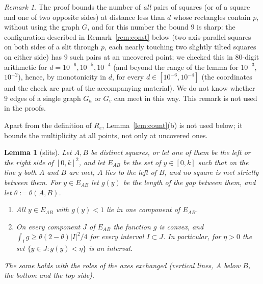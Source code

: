 \documentclass[11pt]{amsart}
\newtheorem{lemma}[theorem]{Lemma}
\theoremstyle{definition}
\theoremstyle{remark}
\newtheorem{remark}[theorem]{Remark}
\begin{document}
\begin{remark}
The proof bounds the number of \emph{all} pairs of squares (or of a square and one of two opposite sides) at distance less than $d$ whose
rectangles contain $p$, without using the graph $G$, and for this number the bound $9$ is sharp: the configuration described in
Remark~\ref{rem:const} below (two axis-parallel squares on both sides of a slit through $p$, each nearly touching two slightly
tilted squares on either side) has $9$ such pairs at an uncovered point; we checked this in $80$-digit arithmetic for
$d=10^{-6},10^{-5},10^{-4}$ (and beyond the range of the lemma for $10^{-3}$, $10^{-2}$), hence, by monotonicity in $d$,
for every $d\in[10^{-6},10^{-4}]$ (the coordinates and the check are part of the accompanying material). We do not know whether $9$ edges of a single graph $G_h$ or $G_v$ can meet in this way.
This remark is not used in the proofs.
\end{remark}

Apart from the definition of $R_e$, Lemma~\ref{lem:count}(b) is not used below; it bounds the multiplicity at all points,
not only at uncovered ones.

\begin{lemma}[slits]\label{lem:slit}
Let $A,B$ be distinct squares, or let one of them be the left or the right side of $[0,k]^2$, and let $E_{AB}$ be the set
of $y\in[0,k]$ such that on the line $y$ both $A$ and $B$ are met, $A$ lies to the left of $B$, and no square is met
strictly between them. For $y\in E_{AB}$ let $g(y)$ be the length of the gap between them, and let $\theta:=\theta(A,B)$.
\begin{enumerate}[label=(\alph*)]
\item All $y\in E_{AB}$ with $g(y)<1$ lie in one component of $E_{AB}$.
\item On every component $J$ of $E_{AB}$ the function $g$ is convex, and $\int_Ig\ge\theta(2-\theta)|I|^2/4$ for every interval
$I\subset J$. In particular, for $\eta>0$ the set $\{y\in J:g(y)<\eta\}$ is an interval.
\end{enumerate}
The same holds with the roles of the axes exchanged (vertical lines, $A$ below $B$, the bottom and the top side).
\end{lemma}
\end{document}
